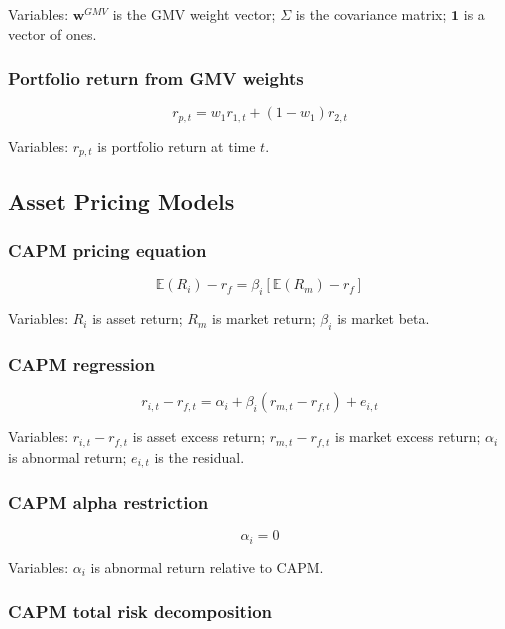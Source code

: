 \documentclass[
  8pt,
  twocolumn]{extarticle}
\begin{document}
Variables: \(\mathbf w^{GMV}\) is the GMV weight vector; \(\Sigma\) is
the covariance matrix; \(\mathbf 1\) is a vector of ones.

\subsubsection{Portfolio return from GMV
weights}\label{portfolio-return-from-gmv-weights}

\[
r_{p,t}=w_1r_{1,t}+(1-w_1)r_{2,t}
\]

Variables: \(r_{p,t}\) is portfolio return at time \(t\).

\subsection{Asset Pricing Models}\label{asset-pricing-models}

\subsubsection{CAPM pricing equation}\label{capm-pricing-equation}

\[
\mathbb E(R_i)-r_f=\beta_i[\mathbb E(R_m)-r_f]
\]

Variables: \(R_i\) is asset return; \(R_m\) is market return;
\(\beta_i\) is market beta.

\subsubsection{CAPM regression}\label{capm-regression}

\[
r_{i,t}-r_{f,t}=\alpha_i+\beta_i(r_{m,t}-r_{f,t})+e_{i,t}
\]

Variables: \(r_{i,t}-r_{f,t}\) is asset excess return;
\(r_{m,t}-r_{f,t}\) is market excess return; \(\alpha_i\) is abnormal
return; \(e_{i,t}\) is the residual.

\subsubsection{CAPM alpha restriction}\label{capm-alpha-restriction}

\[
\alpha_i=0
\]

Variables: \(\alpha_i\) is abnormal return relative to CAPM.

\subsubsection{CAPM total risk
decomposition}\label{capm-total-risk-decomposition}
\end{document}

